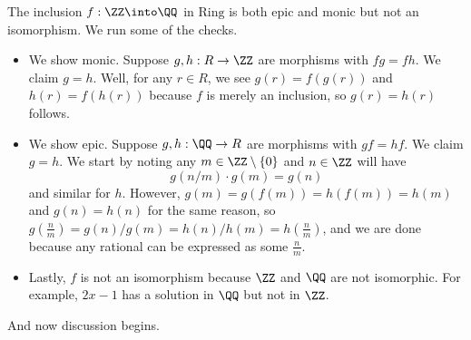 \begin{ex}
	The inclusion $f:\ZZ\into\QQ$ in $\mathrm{Ring}$ is both epic and monic but not an isomorphism. We run some of the checks.
	\begin{itemize}
		\item We show monic. Suppose $g,h:R\to\ZZ$ are morphisms with $fg=fh.$ We claim $g=h$. Well, for any $r\in R$, we see $g(r)=f(g(r))$ and $h(r)=f(h(r))$ because $f$ is merely an inclusion, so $g(r)=h(r)$ follows.
		\item We show epic. Suppose $g,h:\QQ\to R$ are morphisms with $gf=hf$. We claim $g=h$. We start by noting any $m\in\ZZ\setminus\{0\}$ and $n\in\ZZ$ will have
		\[g\left(n/m\right)\cdot g(m)=g(n)\]
		and similar for $h$. However, $g(m)=g(f(m))=h(f(m))=h(m)$ and $g(n)=h(n)$ for the same reason, so $g\left(\frac nm\right)=g(n)/g(m)=h(n)/h(m)=h\left(\frac nm\right)$, and we are done because any rational can be expressed as some $\frac nm$.
		\item Lastly, $f$ is not an isomorphism because $\ZZ$ and $\QQ$ are not isomorphic. For example, $2x-1$ has a solution in $\QQ$ but not in $\ZZ$.
	\end{itemize}
\end{ex}
And now discussion begins.